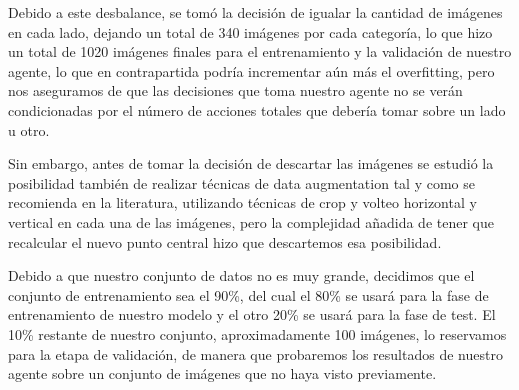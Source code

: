 Debido a este desbalance, se tomó la decisión de igualar la cantidad de imágenes en cada lado, dejando un total de 340 imágenes por cada categoría, lo que hizo un total de 1020 imágenes finales para el entrenamiento y la validación de nuestro agente, lo que en contrapartida podría incrementar aún más el overfitting, pero nos aseguramos de que las decisiones que toma nuestro agente no se verán condicionadas por el número de acciones totales que debería tomar sobre un lado u otro. 
\medskip

Sin embargo, antes de tomar la decisión de descartar las imágenes se estudió la posibilidad también de realizar técnicas de data augmentation tal y como se recomienda en la literatura, utilizando técnicas de crop y volteo horizontal y vertical en cada una de las imágenes, pero la complejidad añadida de tener que recalcular el nuevo punto central hizo que descartemos esa posibilidad.
\medskip

Debido a que nuestro conjunto de datos no es muy grande, decidimos que el conjunto de entrenamiento sea el 90\%, del cual el 80\% se usará para la fase de entrenamiento de nuestro modelo y el otro 20\% se usará para la fase de test. El 10\% restante de nuestro conjunto, aproximadamente 100 imágenes, lo reservamos para la etapa de validación, de manera que probaremos los resultados de nuestro agente sobre un conjunto de imágenes que no haya visto previamente.

